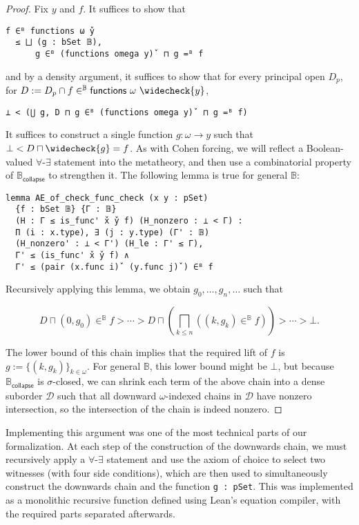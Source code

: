 \documentclass[sigplan,10pt,review, anonymous]{acmart}
\newcommand{\B}{\mathbb{B}}
\theoremstyle{definition}
\begin{document}
\begin{proof}
  Fix \(y\) and \(f\). It suffices to show that
\begin{lstlisting}
f ∈ᴮ functions ω y̌
  ≤ ⨆ (g : bSet 𝔹),
      g ∈ᴮ (functions omega y)̌  ⊓ g =ᴮ f
\end{lstlisting}
  and by a density argument, it suffices to show that for every principal open \(D_p\), for \(D := D_p \cap f \in^{\B} \mathsf{functions}\ \omega \ \widecheck{y}\),
\begin{lstlisting}
⊥ < (⋃ g, D ⊓ g ∈ᴮ (functions omega y)̌  ⊓ g =ᴮ f)
\end{lstlisting}
  It suffices to construct a single function \(g : \omega \to y\) such that \(\bot < D \sqcap \widecheck{g} = f\).
  As with Cohen forcing, we will reflect a Boolean-valued \(\forall\)-\(\exists\) statement into the metatheory, and then use a combinatorial property of \(\mathbb{B}_{\mathsf{collapse}}\) to strengthen it.
  The following lemma is true for general \(\mathbb{B}\):
\begin{lstlisting}
lemma AE_of_check_func_check (x y : pSet)
  {f : bSet 𝔹} {Γ : 𝔹}
  (H : Γ ≤ is_func' x̌ y̌ f) (H_nonzero : ⊥ < Γ) :
  Π (i : x.type), ∃ (j : y.type) (Γ' : 𝔹)
  (H_nonzero' : ⊥ < Γ') (H_le : Γ' ≤ Γ),
  Γ' ≤ (is_func' x̌ y̌ f) ∧
  Γ' ≤ (pair (x.func i)̌  (y.func j)̌ ) ∈ᴮ f
\end{lstlisting}
Recursively applying this lemma, we obtain \(g_0, \dots, g_n, \dots\) such that

\[D \sqcap (0 , g_0) \in^{\mathbb{B}} f > \cdots > D \sqcap \left(\bigsqcap_{k \leq n} ((k, g_k) \in^{\mathbb{B}} f)\right) > \cdots > \bot. \]

The lower bound of this chain implies that the required lift of \(f\) is
\(g := \{(k, g_k)\}_{k \in \omega}\).
For general \(\mathbb{B}\), this lower bound might be \(\bot\), but because \(\mathbb{B}_{\mathsf{collapse}}\) is \(\sigma\)-closed,
we can shrink each term of the above chain into a dense suborder \(\mathcal{D}\) such that all downward \(\omega\)-indexed chains in \(\mathcal{D}\) have nonzero intersection, so the intersection of the chain is indeed nonzero.
\end{proof}

Implementing this argument was one of the most technical parts of our formalization. At each step of the construction of the downwards chain, we must recursively apply a \(\forall\)-\(\exists\) statement and use the axiom of choice to select two witnesses (with four side conditions), which are then used to simultaneously construct the downwards chain and the function \lstinline{g : pSet}. This was implemented as a monolithic recursive function defined using Lean's equation compiler, with the required parts separated afterwards.
\end{document}
